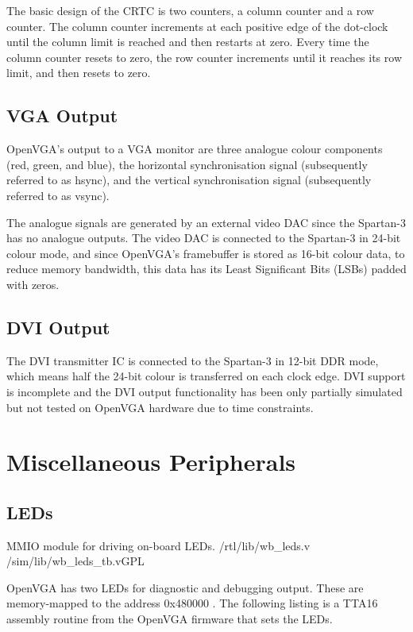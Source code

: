 The basic design of the CRTC is two counters, a column counter and a row counter.
The column counter increments at each positive edge of the dot-clock until the
column limit is reached and then restarts at zero. Every time the column counter
resets to zero, the row counter increments until it reaches its row limit, and
then resets to zero.


\subsection{VGA Output}
\label{VIDEO_VGA_Output}

OpenVGA's output to a VGA monitor are three analogue colour components (red,
green, and blue), the horizontal synchronisation signal (subsequently referred to
as hsync), and the vertical synchronisation signal (subsequently referred to as
vsync).

The analogue signals are generated by an external video DAC since the Spartan-3
has no analogue outputs. The video DAC is connected to the Spartan-3 in 24-bit
colour mode, and since OpenVGA's framebuffer is stored as 16-bit colour data, to
reduce memory bandwidth, this data has its Least Significant
Bits (LSBs) padded with
zeros.


\subsection{DVI Output}
\label{VIDEO_DVI_Output}

The DVI transmitter IC is connected to the Spartan-3 in 12-bit DDR mode, which
means half the 24-bit colour is transferred on each clock edge. DVI support is
incomplete and the DVI output functionality has been only partially simulated but
not tested on OpenVGA hardware due to time constraints.


\section{Miscellaneous Peripherals}

\subsection{LEDs}
\label{LED_Driver}

{MMIO module for driving on-board LEDs.} {/rtl/lib/wb\_leds.v}
{/sim/lib/wb\_leds\_tb.v}{GPL}

OpenVGA has two LEDs for diagnostic and debugging output. These are memory-mapped
to the address 0x480000 . The following listing is a TTA16 assembly routine from
the OpenVGA firmware that sets the LEDs.


